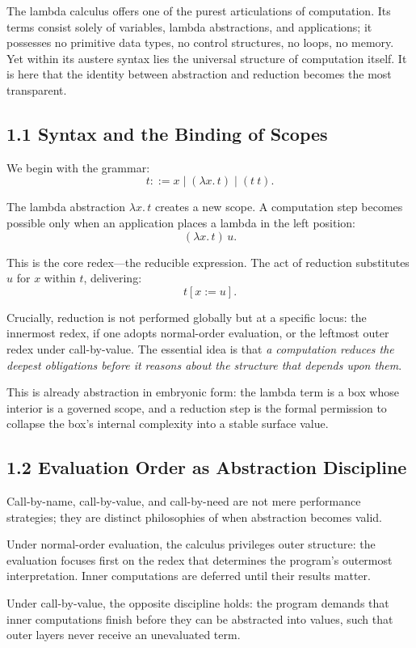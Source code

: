 \documentclass[11pt,letterpaper]{article}
\begin{document}
The lambda calculus offers one of the purest articulations of computation. Its terms consist solely of variables, lambda abstractions, and applications; it possesses no primitive data types, no control structures, no loops, no memory. Yet within its austere syntax lies the universal structure of computation itself. It is here that the identity between abstraction and reduction becomes the most transparent.

\subsection{1.1 Syntax and the Binding of Scopes}

We begin with the grammar:
\[
t ::= x \mid (\lambda x.\, t) \mid (t~t).
\]

The lambda abstraction \(\lambda x.\, t\) creates a new scope. A computation step becomes possible only when an application places a lambda in the left position:
\[
(\lambda x.\, t)\, u.
\]

This is the core redex---the reducible expression. The act of reduction substitutes \(u\) for \(x\) within \(t\), delivering:
\[
t[x := u].
\]

Crucially, reduction is not performed globally but at a specific locus: the innermost redex, if one adopts normal-order evaluation, or the leftmost outer redex under call-by-value. The essential idea is that \emph{a computation reduces the deepest obligations before it reasons about the structure that depends upon them}.

This is already abstraction in embryonic form: the lambda term is a box whose interior is a governed scope, and a reduction step is the formal permission to collapse the box’s internal complexity into a stable surface value.

\subsection{1.2 Evaluation Order as Abstraction Discipline}

Call-by-name, call-by-value, and call-by-need are not mere performance strategies; they are distinct philosophies of when abstraction becomes valid.

Under normal-order evaluation, the calculus privileges outer structure: the evaluation focuses first on the redex that determines the program’s outermost interpretation. Inner computations are deferred until their results matter.

Under call-by-value, the opposite discipline holds: the program demands that inner computations finish before they can be abstracted into values, such that outer layers never receive an unevaluated term.
\end{document}
